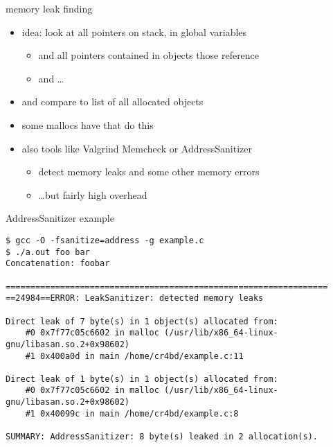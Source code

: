 \begin{frame}{memory leak finding}
    \begin{itemize}
    \item idea: look at all pointers on stack, in global variables
    \begin{itemize}
        \item and all pointers contained in objects those reference
        \item and \ldots
    \end{itemize}
    \item and compare to list of all allocated objects
    \vspace{.5cm}
    \item some mallocs have  that do this
    \item also tools like Valgrind Memcheck or AddressSanitizer
        \begin{itemize}
            \item detect memory leaks and some other memory errors
            \item \ldots but fairly high overhead
        \end{itemize}
    \end{itemize}
\end{frame}

\begin{frame}[fragile,label=asanEx]{AddressSanitizer example}
\begin{lstlisting}
$ gcc -O -fsanitize=address -g example.c
$ ./a.out foo bar
Concatenation: foobar

=================================================================
==24984==ERROR: LeakSanitizer: detected memory leaks

Direct leak of 7 byte(s) in 1 object(s) allocated from:
    #0 0x7f77c05c6602 in malloc (/usr/lib/x86_64-linux-gnu/libasan.so.2+0x98602)
    #1 0x400a0d in main /home/cr4bd/example.c:11

Direct leak of 1 byte(s) in 1 object(s) allocated from:
    #0 0x7f77c05c6602 in malloc (/usr/lib/x86_64-linux-gnu/libasan.so.2+0x98602)
    #1 0x40099c in main /home/cr4bd/example.c:8

SUMMARY: AddressSanitizer: 8 byte(s) leaked in 2 allocation(s).
\end{lstlisting}
\end{frame}

